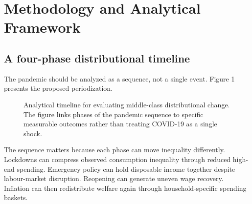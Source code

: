 \documentclass[11pt]{article}
\begin{document}
\section{Methodology and Analytical Framework}

\subsection{A four-phase distributional timeline}
The pandemic should be analyzed as a sequence, not a single event. Figure 1 presents the proposed periodization.

\begin{figure}[t]
\centering
{}
\caption{Analytical timeline for evaluating middle-class distributional change. The figure links phases of the pandemic sequence to specific measurable outcomes rather than treating COVID-19 as a single shock.}
\end{figure}

The sequence matters because each phase can move inequality differently. Lockdowns can compress observed consumption inequality through reduced high-end spending. Emergency policy can hold disposable income together despite labour-market disruption. Reopening can generate uneven wage recovery. Inflation can then redistribute welfare again through household-specific spending baskets.
\end{document}
